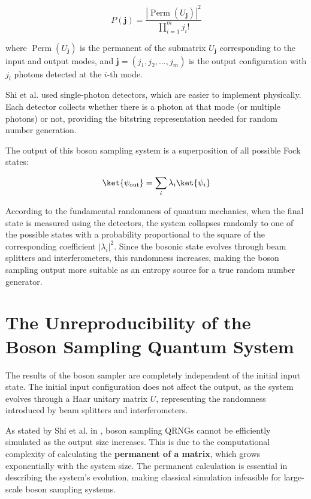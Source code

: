 \begin{equation}
    P(\mathbf{j}) = \frac{\left| \operatorname{Perm}(U_{\mathbf{j}}) \right|^2}{\prod_{i=1}^{m} j_i!}
\end{equation}





where \( \operatorname{Perm}(U_{\mathbf{j}}) \) is the permanent of the submatrix \( U_{\mathbf{j}} \) corresponding to the input and output modes, and \( \mathbf{j} = (j_1, j_2, \dots, j_m) \) is the output configuration with \( j_i \) photons detected at the \( i \)-th mode.

Shi et al. used single-photon detectors, which are easier to implement physically. Each detector collects whether there is a photon at that mode (or multiple photons) or not, providing the bitstring representation needed for random number generation.

The output of this boson sampling system is a superposition of all possible Fock states:


\begin{equation}
    \ket{\psi_{\text{out}}} = \sum_i \lambda_i \ket{\psi_i}

\end{equation}    



According to the fundamental randomness of quantum mechanics, when the final state is measured using the detectors, the system collapses randomly to one of the possible states with a probability proportional to the square of the corresponding coefficient \( |\lambda_i|^2 \). Since the bosonic state evolves through beam splitters and interferometers, this randomness increases, making the boson sampling output more suitable as an entropy source for a true random number generator.


\section{The Unreproducibility of the Boson Sampling Quantum System}

The results of the boson sampler are completely independent of the initial input state. The initial input configuration does not affect the output, as the system evolves through a Haar unitary matrix \( U \), representing the randomness introduced by beam splitters and interferometers.

As stated by Shi et al. in \cite{shi_Twa3na}, boson sampling QRNGs cannot be efficiently simulated as the output size increases. This is due to the computational complexity of calculating the \textbf{permanent of a matrix}, which grows exponentially with the system size. The permanent calculation is essential in describing the system's evolution, making classical simulation infeasible for large-scale boson sampling systems.



